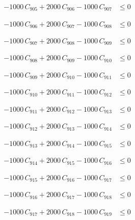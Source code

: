 \documentclass[a4paper,11pt]{article}
\begin{document}
\begin{align}
-1000\,C_{905} + 2000\,C_{906} - 1000\,C_{907} &\leq 0 \nonumber
\end{align}

\begin{align}
-1000\,C_{906} + 2000\,C_{907} - 1000\,C_{908} &\leq 0 \nonumber
\end{align}

\begin{align}
-1000\,C_{907} + 2000\,C_{908} - 1000\,C_{909} &\leq 0 \nonumber
\end{align}

\begin{align}
-1000\,C_{908} + 2000\,C_{909} - 1000\,C_{910} &\leq 0 \nonumber
\end{align}

\begin{align}
-1000\,C_{909} + 2000\,C_{910} - 1000\,C_{911} &\leq 0 \nonumber
\end{align}

\begin{align}
-1000\,C_{910} + 2000\,C_{911} - 1000\,C_{912} &\leq 0 \nonumber
\end{align}

\begin{align}
-1000\,C_{911} + 2000\,C_{912} - 1000\,C_{913} &\leq 0 \nonumber
\end{align}

\begin{align}
-1000\,C_{912} + 2000\,C_{913} - 1000\,C_{914} &\leq 0 \nonumber
\end{align}

\begin{align}
-1000\,C_{913} + 2000\,C_{914} - 1000\,C_{915} &\leq 0 \nonumber
\end{align}

\begin{align}
-1000\,C_{914} + 2000\,C_{915} - 1000\,C_{916} &\leq 0 \nonumber
\end{align}

\begin{align}
-1000\,C_{915} + 2000\,C_{916} - 1000\,C_{917} &\leq 0 \nonumber
\end{align}

\begin{align}
-1000\,C_{916} + 2000\,C_{917} - 1000\,C_{918} &\leq 0 \nonumber
\end{align}

\begin{align}
-1000\,C_{917} + 2000\,C_{918} - 1000\,C_{919} &\leq 0 \nonumber
\end{align}
\end{document}
